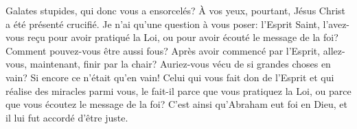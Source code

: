 Galates stupides, qui donc vous a ensorcelés?
À vos yeux, pourtant, Jésus Christ a été présenté crucifié.
Je n’ai qu’une question à vous poser:
	l’Esprit Saint, l’avez-vous reçu pour avoir pratiqué la Loi,
	ou pour avoir écouté le message de la foi?
	Comment pouvez-vous être aussi fous?
Après avoir commencé par l’Esprit,
	allez-vous, maintenant, finir par la chair?
Auriez-vous vécu de si grandes choses en vain?
Si encore ce n’était qu’en vain!
Celui qui vous fait don de l’Esprit et qui réalise des miracles parmi vous,
	le fait-il parce que vous pratiquez la Loi,
	ou parce que vous écoutez le message de la foi?
C’est ainsi qu’Abraham eut foi en Dieu, et il lui fut accordé d’être juste.

